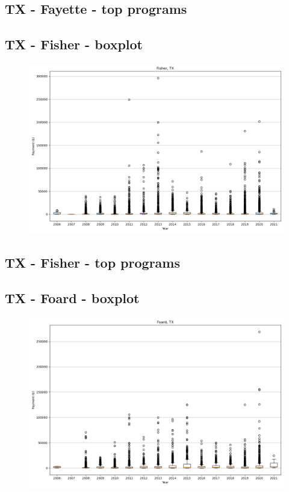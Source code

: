 \subsection*{TX - Fayette - top programs}

\newpage
\subsection*{TX - Fisher - boxplot}
\begin{figure}[h]
\centering
\includegraphics[width=7in]{../output/boxplots/counties/Fisher-TX_boxplot.png}
\end{figure}


\subsection*{TX - Fisher - top programs}

\newpage
\subsection*{TX - Foard - boxplot}
\begin{figure}[h]
\centering
\includegraphics[width=7in]{../output/boxplots/counties/Foard-TX_boxplot.png}
\end{figure}



